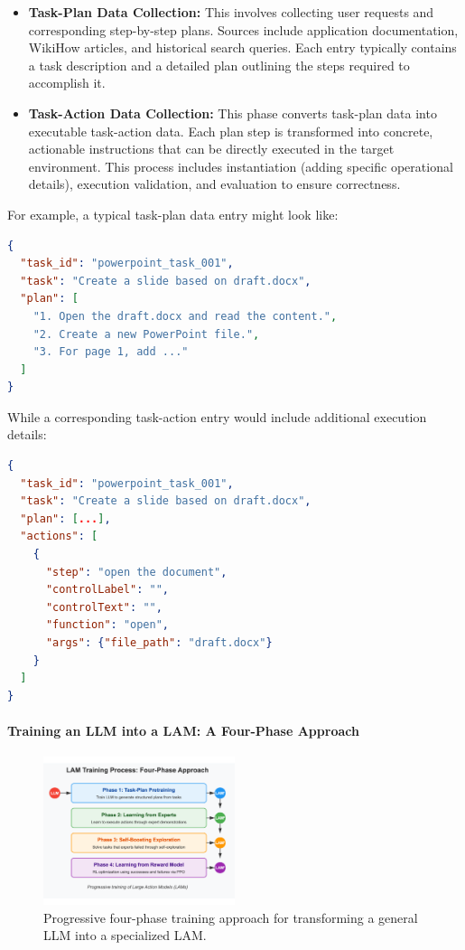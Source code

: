 \documentclass[journal,twoside,10pt]{IEEEtran}
\begin{document}
\begin{itemize}
    \item \textbf{Task-Plan Data Collection:} This involves collecting user requests and corresponding step-by-step plans. Sources include application documentation, WikiHow articles, and historical search queries. Each entry typically contains a task description and a detailed plan outlining the steps required to accomplish it.
    
    \item \textbf{Task-Action Data Collection:} This phase converts task-plan data into executable task-action data. Each plan step is transformed into concrete, actionable instructions that can be directly executed in the target environment. This process includes instantiation (adding specific operational details), execution validation, and evaluation to ensure correctness.
\end{itemize}

For example, a typical task-plan data entry might look like:

\begin{lstlisting}[language=JSON]
{
  "task_id": "powerpoint_task_001",
  "task": "Create a slide based on draft.docx",
  "plan": [
    "1. Open the draft.docx and read the content.",
    "2. Create a new PowerPoint file.",
    "3. For page 1, add ..."
  ]
}
\end{lstlisting}

While a corresponding task-action entry would include additional execution details:

\begin{lstlisting}[language=JSON]
{
  "task_id": "powerpoint_task_001",
  "task": "Create a slide based on draft.docx",
  "plan": [...],
  "actions": [
    {
      "step": "open the document",
      "controlLabel": "",
      "controlText": "",
      "function": "open",
      "args": {"file_path": "draft.docx"}
    }
  ]
}
\end{lstlisting}

\paragraph{Training an LLM into a LAM: A Four-Phase Approach}

\begin{figure}[htbp]
    \centering
    \includegraphics[width=0.5\textwidth]{traning_phases.pdf}
    \caption{Progressive four-phase training approach for transforming a general LLM into a specialized LAM.}
    \label{fig:lam-training}
\end{figure}
\end{document}
